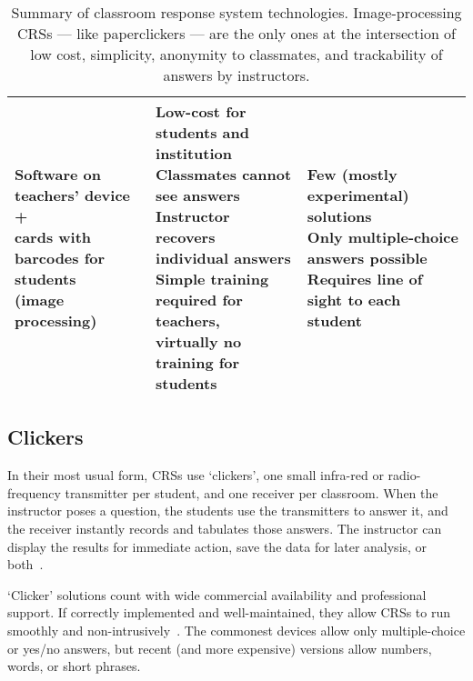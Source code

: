 \begin{table*}[t]
\begin{center}
\begin{tabular}{l l l}
            \hline
            \makecell[l]{Software on teachers' device +\\cards with barcodes for students\\(image processing)}&
            \makecell[l]{
                Low-cost for students and institution\\
                Classmates cannot see answers\\
                Instructor recovers individual answers\\
                Simple training required for teachers,\\virtually no training for students
            }&
            \makecell[l]{
                Few (mostly experimental) solutions\\
                Only multiple-choice answers possible\\
                Requires line of sight to each student
            }\\

            \hline
        \end{tabular}
    \end{center}
    \caption{Summary of classroom response system technologies. Image-processing CRSs --- like paperclickers --- are the only ones at the intersection of low cost, simplicity, anonymity to classmates, and trackability of answers by instructors. }
    \label{tab:1}
\end{table*}


\subsection{Clickers}
In their most usual form, CRSs use ‘clickers’, one small infra-red or radio-frequency transmitter per student, and one receiver per classroom\cite{caldwell2007clickers}. When the instructor poses a question, the students use the transmitters to answer it, and the receiver instantly  records and tabulates those answers. The instructor can display the results for immediate action, save the data for later analysis, or both~\cite{beatty2005transforming}.

‘Clicker’ solutions count with wide commercial availability and professional support. If correctly implemented and well-maintained, they allow CRSs to run smoothly and non-intrusively~\cite{caldwell2007clickers}. The commonest devices allow only multiple-choice or yes/no answers, but recent (and more expensive) versions allow numbers, words, or short phrases.

